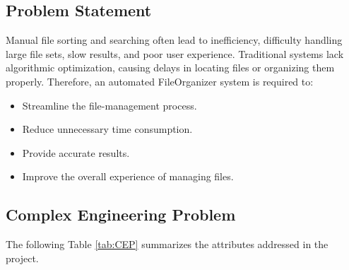 \documentclass[12pt]{report}
\begin{document}
\subsection{Problem Statement}
Manual file sorting and searching often lead to inefficiency, difficulty handling large file sets, slow results, and poor user experience. Traditional systems lack algorithmic optimization, causing delays in locating files or organizing them properly.
Therefore, an automated FileOrganizer system is required to:
\begin{itemize}
    \item Streamline the file-management process.
    \item Reduce unnecessary time consumption.
    \item Provide accurate results.
    \item Improve the overall experience of managing files.
\end{itemize}

\subsection{Complex Engineering Problem}
The following Table \ref{tab:CEP} summarizes the attributes addressed in the project.
\end{document}
